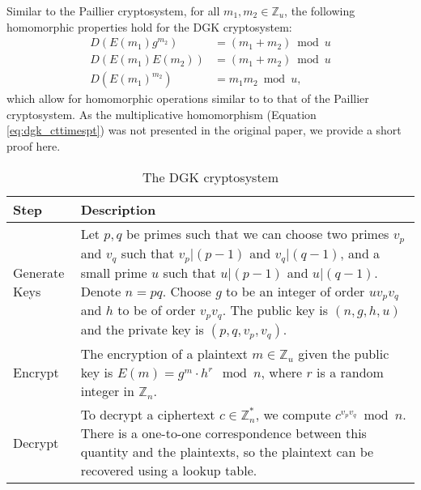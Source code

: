 Similar to the Paillier cryptosystem, for all $m_1,m_2 \in \mathbb{Z}_u$, the following homomorphic properties hold for the DGK cryptosystem:
\begin{align}
    D(E(m_1)g^{m_2}) &=(m_1+m_2)\bmod u \label{eq:dgk_ctpluspt}\\
    D(E(m_1)E(m_2)) &=(m_1+m_2)\bmod u \label{eq:dgk_ctplusct}\\
    D(E(m_1)^{m_2}) &= m_1m_2\bmod u, \label{eq:dgk_cttimespt}
\end{align}
which allow for homomorphic operations similar to to that of the Paillier cryptosystem.
As the multiplicative homomorphism (Equation \ref{eq:dgk_cttimespt}) was not presented in the original paper, we provide a short proof here.
\begin{table}[ht]
	\caption{The DGK cryptosystem}
	\label{tab:dgk_summary}
    \begin{tabular}{
        p{}
        p{}}
		\toprule
		Step & Description\\
        \midrule
            Generate \newline Keys &
            Let $p,q$ be primes such that we can choose two primes $v_p$ and $v_q$ such that $v_p | (p-1)$ and $v_q | (q-1)$, and a small prime $u$ such that $u | (p-1)$ and $u | (q-1)$. \newline
            Denote $n = pq$. \newline
            Choose $g$ to be an integer of order $uv_pv_q$ and $h$ to be of order $v_pv_q$.\newline
            The public key is $(n,g,h,u)$ and the private key is $(p,q,v_p,v_q)$.
            \\
            Encrypt &
            The encryption of a plaintext $m \in \mathbb{Z}_u$ given the public key is $E(m) = g^m \cdot h^r \mod{n}$, where $r$ is a random integer in $\mathbb{Z}_n$.
            \\
            Decrypt &
            To decrypt a ciphertext $c \in \mathbb{Z}_n^\ast$, we compute $c^{v_pv_q} \bmod n$. There is a one-to-one correspondence between this quantity and the plaintexts, so the plaintext can be recovered using a lookup table.
            \\
	    \bottomrule
    \end{tabular}
\end{table}


